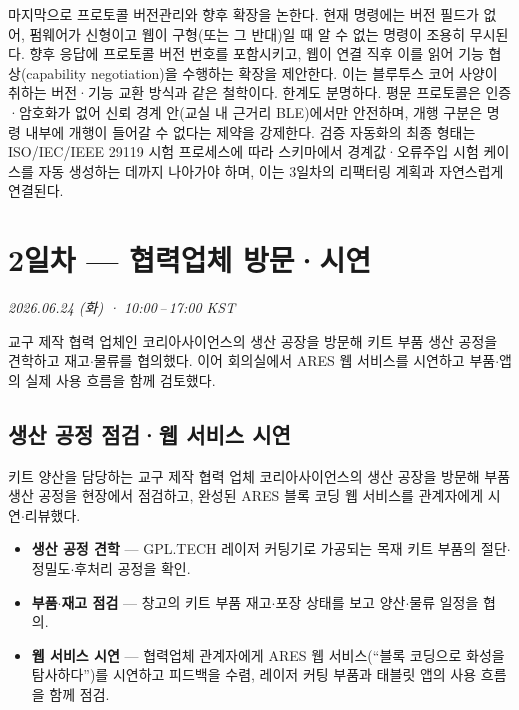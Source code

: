 마지막으로 프로토콜 버전관리와 향후 확장을 논한다. 현재 명령에는 버전 필드가 없어, 펌웨어가 신형이고 웹이 구형(또는 그 반대)일 때 알 수 없는 명령이 조용히 무시된다. 향후  응답에 프로토콜 버전 번호를 포함시키고, 웹이 연결 직후 이를 읽어 기능 협상(capability negotiation)을 수행하는 확장을 제안한다. 이는 블루투스 코어 사양이 취하는 버전·기능 교환 방식\cite{bluetooth54}과 같은 철학이다. 한계도 분명하다. 평문 프로토콜은 인증·암호화가 없어 신뢰 경계 안(교실 내 근거리 BLE)에서만 안전하며, 개행 구분은 명령 내부에 개행이 들어갈 수 없다는 제약을 강제한다. 검증 자동화의 최종 형태는 ISO/IEC/IEEE 29119 시험 프로세스\cite{iso29119}에 따라 스키마에서 경계값·오류주입 시험 케이스를 자동 생성하는 데까지 나아가야 하며, 이는 3일차의 리팩터링 계획과 자연스럽게 연결된다.

\chapter{2일차 — 협력업체 방문·시연}
\textit{2026.06.24 (화) · 10:00\,--\,17:00 KST}

\begin{summarybox}
교구 제작 협력 업체인 코리아사이언스의 생산 공장을 방문해 키트 부품 생산 공정을
견학하고 재고$\cdot$물류를 협의했다. 이어 회의실에서 ARES 웹 서비스를 시연하고
부품$\cdot$앱의 실제 사용 흐름을 함께 검토했다.
\end{summarybox}

\section{생산 공정 점검·웹 서비스 시연}
키트 양산을 담당하는 교구 제작 협력 업체 코리아사이언스의 생산 공장을 방문해 부품 생산
공정을 현장에서 점검하고, 완성된 ARES 블록 코딩 웹 서비스를 관계자에게
시연$\cdot$리뷰했다.

\begin{itemize}
  \item \textbf{생산 공정 견학} — GPL.TECH 레이저 커팅기로 가공되는 목재 키트 부품의
  절단$\cdot$정밀도$\cdot$후처리 공정을 확인.
  \item \textbf{부품$\cdot$재고 점검} — 창고의 키트 부품 재고$\cdot$포장 상태를 보고
  양산$\cdot$물류 일정을 협의.
  \item \textbf{웹 서비스 시연} — 협력업체 관계자에게 ARES 웹 서비스(“블록 코딩으로
  화성을 탐사하다”)를 시연하고 피드백을 수렴, 레이저 커팅 부품과 태블릿 앱의 사용
  흐름을 함께 점검.
\end{itemize}

